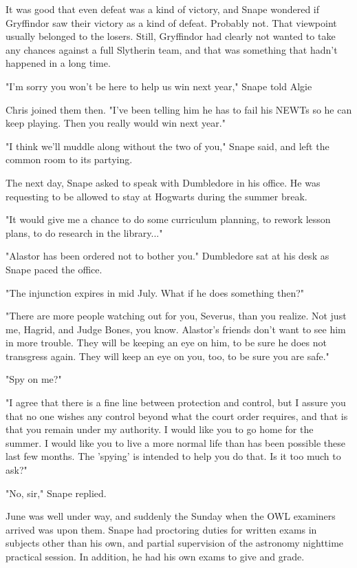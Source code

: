 \documentclass[a4paper,11pt]{article}
\begin{document}
It was good that even defeat was a kind of victory, and Snape wondered if Gryffindor saw their victory as a kind of defeat. Probably not. That viewpoint usually belonged to the losers. Still, Gryffindor had clearly not wanted to take any chances against a full Slytherin team, and that was something that hadn't happened in a long time.

"I'm sorry you won't be here to help us win next year," Snape told Algie

Chris joined them then. "I've been telling him he has to fail his NEWTs so he can keep playing. Then you really would win next year."

"I think we'll muddle along without the two of you," Snape said, and left the common room to its partying.

The next day, Snape asked to speak with Dumbledore in his office. He was requesting to be allowed to stay at Hogwarts during the summer break.

"It would give me a chance to do some curriculum planning, to rework lesson plans, to do research in the library..."

"Alastor has been ordered not to bother you." Dumbledore sat at his desk as Snape paced the office.

"The injunction expires in mid July. What if he does something then?"

"There are more people watching out for you, Severus, than you realize. Not just me, Hagrid, and Judge Bones, you know. Alastor's friends don't want to see him in more trouble. They will be keeping an eye on him, to be sure he does not transgress again. They will keep an eye on you, too, to be sure you are safe."

"Spy on me?"

"I agree that there is a fine line between protection and control, but I assure you that no one wishes any control beyond what the court order requires, and that is that you remain under my authority. I would like you to go home for the summer. I would like you to live a more normal life than has been possible these last few months. The 'spying' is intended to help you do that. Is it too much to ask?"

"No, sir," Snape replied.

June was well under way, and suddenly the Sunday when the OWL examiners arrived was upon them. Snape had proctoring duties for written exams in subjects other than his own, and partial supervision of the astronomy nighttime practical session. In addition, he had his own exams to give and grade.
\end{document}
